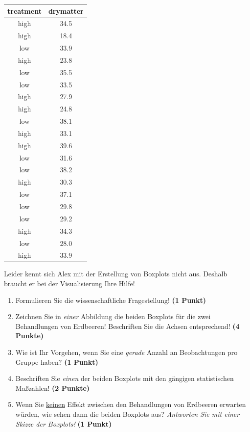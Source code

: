 \documentclass[a4paper, 9pt]{scrartcl}\usepackage[]{graphicx}\usepackage[]{xcolor}
\begin{document}
\begin{table}[!h]
\centering
\begin{tabular}{cc}
\toprule
treatment & drymatter\\
\midrule
high & 34.5\\
high & 18.4\\
low & 33.9\\
high & 23.8\\
low & 35.5\\
\addlinespace
low & 33.5\\
high & 27.9\\
high & 24.8\\
low & 38.1\\
high & 33.1\\
\addlinespace
high & 39.6\\
low & 31.6\\
low & 38.2\\
high & 30.3\\
low & 37.1\\
\addlinespace
low & 29.8\\
low & 29.2\\
high & 34.3\\
low & 28.0\\
high & 33.9\\
\bottomrule
\end{tabular}
\end{table}



Leider kennt sich Alex mit der Erstellung von Boxplots nicht aus. Deshalb braucht er bei der Visualisierung Ihre Hilfe!

\begin{enumerate}
\item Formulieren Sie die wissenschaftliche Fragestellung! \textbf{(1 Punkt)}
\item Zeichnen Sie in \textit{einer} Abbildung die beiden Boxplots für die zwei Behandlungen von Erdbeeren! Beschriften Sie die Achsen entsprechend! \textbf{(4 Punkte)} 
\item Wie ist Ihr Vorgehen, wenn Sie eine \textit{gerade} Anzahl an
  Beobachtungen pro Gruppe haben? \textbf{(1 Punkt)}
\item Beschriften Sie \textit{einen} der beiden Boxplots mit den gängigen
  statistischen Maßzahlen! \textbf{(2 Punkte)}
\item Wenn Sie \underline{keinen} Effekt zwischen den Behandlungen von Erdbeeren erwarten würden, wie sehen dann die beiden Boxplots aus? \textit{Antworten Sie mit einer Skizze der Boxplots!} \textbf{(1 Punkt)}
\end{enumerate} 
\clearpage
\end{document}
